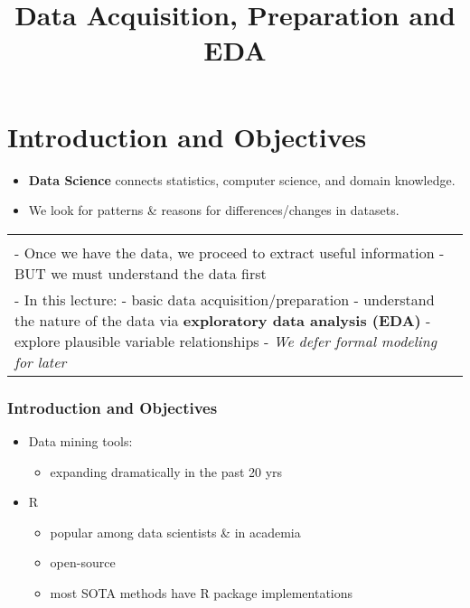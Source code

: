 \documentclass[
]{article}
\title{Data Acquisition, Preparation and EDA}
\author{}
\date{\vspace{-2.5em}}
\providecommand{\tightlist}{%
  \setlength{\itemsep}{0pt}\setlength{\parskip}{0pt}}
\begin{document}
\maketitle

\hypertarget{introduction-and-objectives}{%
\section{Introduction and
Objectives}\label{introduction-and-objectives}}

\begin{itemize}
\tightlist
\item
  \textbf{Data Science} connects statistics, computer science, and
  domain knowledge.
\item
  We look for patterns \& reasons for differences/changes in datasets.
\end{itemize}

\begin{longtable}[]{@{}
  >{\raggedright\arraybackslash}p{}@{}}
\toprule
\endhead
 \\
- Once we have the data, we proceed to extract useful information - BUT
we must understand the data first \\
- In this lecture: - basic data acquisition/preparation - understand the
nature of the data via \textbf{exploratory data analysis (EDA)} -
explore plausible variable relationships - \emph{We defer formal
modeling for later} \\
\bottomrule
\end{longtable}

\frametitle{Introduction and Objectives}

\begin{itemize}
\tightlist
\item
  Data mining tools:

  \begin{itemize}
  \tightlist
  \item
    expanding dramatically in the past 20 yrs
  \end{itemize}
\item
  R

  \begin{itemize}
  \tightlist
  \item
    popular among data scientists \& in academia
  \item
    open-source
  \item
    most SOTA methods have R package implementations
  \end{itemize}
\end{itemize}
\end{document}
